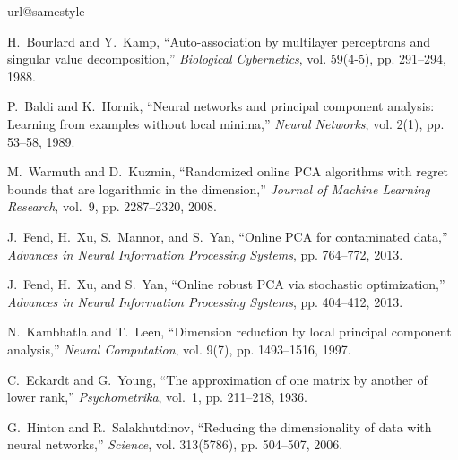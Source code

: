 \documentclass[journal]{IEEEtran}
\begin{document}
\begin{thebibliography}{10}
\providecommand{\url}[1]{#1}
\csname url@samestyle\endcsname
\providecommand{\newblock}{\relax}
\providecommand{\bibinfo}[2]{#2}
\providecommand{\BIBentrySTDinterwordspacing}{\spaceskip=0pt\relax}
\providecommand{\BIBentryALTinterwordstretchfactor}{4}
\providecommand{\BIBentryALTinterwordspacing}{\spaceskip=\fontdimen2\font plus
\BIBentryALTinterwordstretchfactor\fontdimen3\font minus
  \fontdimen4\font\relax}
\providecommand{\BIBforeignlanguage}[2]{{%
\expandafter\ifx\csname l@#1\endcsname\relax
\typeout{** WARNING: IEEEtran.bst: No hyphenation pattern has been}%
\typeout{** loaded for the language `#1'. Using the pattern for}%
\typeout{** the default language instead.}%
\else
\language=\csname l@#1\endcsname
\fi
#2}}
\providecommand{\BIBdecl}{\relax}
\BIBdecl

H.~Bourlard and Y.~Kamp, ``Auto-association by multilayer perceptrons and
  singular value decomposition,'' \emph{Biological Cybernetics}, vol. 59(4-5),
  pp. 291--294, 1988.

P.~Baldi and K.~Hornik, ``Neural networks and principal component analysis:
  Learning from examples without local minima,'' \emph{Neural Networks}, vol.
  2(1), pp. 53--58, 1989.

M.~Warmuth and D.~Kuzmin, ``Randomized online {PCA} algorithms with regret
  bounds that are logarithmic in the dimension,'' \emph{Journal of Machine
  Learning Research}, vol.~9, pp. 2287--2320, 2008.

J.~Fend, H.~Xu, S.~Mannor, and S.~Yan, ``Online {PCA} for contaminated data,''
  \emph{Advances in Neural Information Processing Systems}, pp. 764--772, 2013.

J.~Fend, H.~Xu, and S.~Yan, ``Online robust {PCA} via stochastic
  optimization,'' \emph{Advances in Neural Information Processing Systems}, pp.
  404--412, 2013.

N.~Kambhatla and T.~Leen, ``Dimension reduction by local principal component
  analysis,'' \emph{Neural Computation}, vol. 9(7), pp. 1493--1516, 1997.

C.~Eckardt and G.~Young, ``The approximation of one matrix by another of lower
  rank,'' \emph{Psychometrika}, vol.~1, pp. 211--218, 1936.

G.~Hinton and R.~Salakhutdinov, ``Reducing the dimensionality of data with
  neural networks,'' \emph{Science}, vol. 313(5786), pp. 504--507, 2006.


\end{thebibliography}
\end{document}
